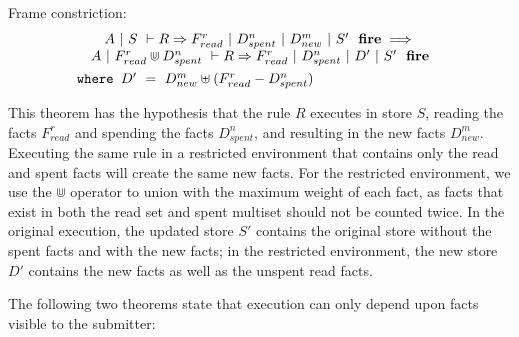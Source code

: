 %

\begin{theorem}
Frame constriction:
$$
\begin{array}{c}
\jFire{A}{S}{R}{F_{read}^r}{D_{spent}^n}{D_{new}^m}{S'}
\implies \\
\quad \jFire{A}{F_{read}^r \Cup D_{spent}^n}{R}{F_{read}^r}{D_{spent}^n}{D'}{S'} \quad
\\[1ex]
\multicolumn{1}{l}{ \texttt{where } D' ~=~ D_{new}^m \uplus (F_{read}^r - D_{spent}^n)}
\\
\end{array}
$$
\end{theorem}

This theorem has the hypothesis that the rule $R$ executes in store $S$, reading the facts $F_{read}^r$ and spending the facts $D_{spent}^n$, and resulting in the new facts $D_{new}^m$.
Executing the same rule in a restricted environment that contains only the read and spent facts will create the same new facts.
For the restricted environment, we use the $\Cup$ operator to union with the maximum weight of each fact, as facts that exist in both the read set and spent multiset should not be counted twice.
In the original execution, the updated store $S'$ contains the original store without the spent facts and with the new facts; in the restricted environment, the new store $D'$ contains the new facts as well as the unspent read facts.


The following two theorems state that execution can only depend upon facts visible to the submitter:

